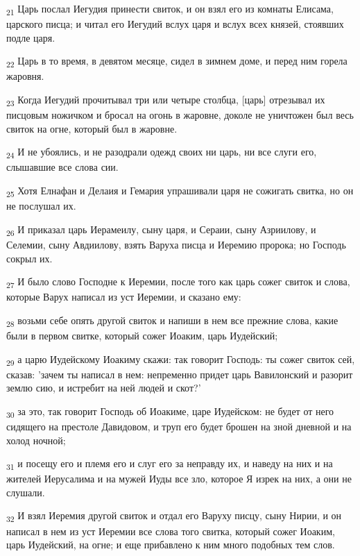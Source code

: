 \begin{tcolorbox}
\textsubscript{21} Царь послал Иегудия принести свиток, и он взял его из комнаты Елисама, царского писца; и читал его Иегудий вслух царя и вслух всех князей, стоявших подле царя.
\end{tcolorbox}
\begin{tcolorbox}
\textsubscript{22} Царь в то время, в девятом месяце, сидел в зимнем доме, и перед ним горела жаровня.
\end{tcolorbox}
\begin{tcolorbox}
\textsubscript{23} Когда Иегудий прочитывал три или четыре столбца, [царь] отрезывал их писцовым ножичком и бросал на огонь в жаровне, доколе не уничтожен был весь свиток на огне, который был в жаровне.
\end{tcolorbox}
\begin{tcolorbox}
\textsubscript{24} И не убоялись, и не разодрали одежд своих ни царь, ни все слуги его, слышавшие все слова сии.
\end{tcolorbox}
\begin{tcolorbox}
\textsubscript{25} Хотя Елнафан и Делаия и Гемария упрашивали царя не сожигать свитка, но он не послушал их.
\end{tcolorbox}
\begin{tcolorbox}
\textsubscript{26} И приказал царь Иерамеилу, сыну царя, и Сераии, сыну Азриилову, и Селемии, сыну Авдиилову, взять Варуха писца и Иеремию пророка; но Господь сокрыл их.
\end{tcolorbox}
\begin{tcolorbox}
\textsubscript{27} И было слово Господне к Иеремии, после того как царь сожег свиток и слова, которые Варух написал из уст Иеремии, и сказано ему:
\end{tcolorbox}
\begin{tcolorbox}
\textsubscript{28} возьми себе опять другой свиток и напиши в нем все прежние слова, какие были в первом свитке, который сожег Иоаким, царь Иудейский;
\end{tcolorbox}
\begin{tcolorbox}
\textsubscript{29} а царю Иудейскому Иоакиму скажи: так говорит Господь: ты сожег свиток сей, сказав: 'зачем ты написал в нем: непременно придет царь Вавилонский и разорит землю сию, и истребит на ней людей и скот?'
\end{tcolorbox}
\begin{tcolorbox}
\textsubscript{30} за это, так говорит Господь об Иоакиме, царе Иудейском: не будет от него сидящего на престоле Давидовом, и труп его будет брошен на зной дневной и на холод ночной;
\end{tcolorbox}
\begin{tcolorbox}
\textsubscript{31} и посещу его и племя его и слуг его за неправду их, и наведу на них и на жителей Иерусалима и на мужей Иуды все зло, которое Я изрек на них, а они не слушали.
\end{tcolorbox}
\begin{tcolorbox}
\textsubscript{32} И взял Иеремия другой свиток и отдал его Варуху писцу, сыну Нирии, и он написал в нем из уст Иеремии все слова того свитка, который сожег Иоаким, царь Иудейский, на огне; и еще прибавлено к ним много подобных тем слов.
\end{tcolorbox}
